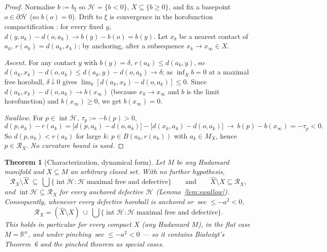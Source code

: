 \documentclass[11pt]{article}
\newtheorem{theorem}{Theorem}[section]
\theoremstyle{remark}
\newcommand{\R}{\mathbb{R}}
\newcommand{\X}{X}
\newcommand{\Xhat}{\widehat{\X}}
\newcommand{\Mx}{M_{\X}}
\newcommand{\Rx}{\mathcal{R}_{\X}}
\newcommand{\Hb}[1]{\mathcal{H}_{#1}}
\begin{document}
\begin{proof}
Normalise $b:=b_{\xi}$ so $\Hb{}=\{b<0\}$, $X\subseteq\{b\ge0\}$, and
fix a basepoint $o\in\partial\Hb{}$ (so $b(o)=0$). Drift to $\xi$ is
convergence in the horofunction compactification \cite[II.8.13]{BH}:
for every fixed $y$, $d(y,a_{k})-d(o,a_{k})\to b(y)-b(o)=b(y)$. Let
$x_{k}$ be a nearest contact of $a_{k}$, $r(a_{k})=d(a_{k},x_{k})$; by
anchoring, after a subsequence $x_{k}\to x_{\infty}\in X$.

\emph{Ascent.} For any contact $y$ with $b(y)=\delta$,
$r(a_{k})\le d(a_{k},y)$, so $d(a_{k},x_{k})-d(o,a_{k})\le
d(a_{k},y)-d(o,a_{k})\to\delta$; as $\inf_{X}b=0$ at a maximal free
horoball, $\delta\downarrow0$ gives
$\lim_k[d(a_{k},x_{k})-d(o,a_{k})]\le 0$. Since
$d(a_{k},x_{k})-d(o,a_{k})\to b(x_{\infty})$ (because $x_{k}\to
x_{\infty}$ and $b$ is the limit horofunction) and $b(x_{\infty})\ge0$,
we get $b(x_{\infty})=0$.

\emph{Swallow.} For $p\in\operatorname{int}\Hb{}$, $\tau_{p}:=-b(p)>0$,
\[
  d(p,a_{k})-r(a_{k})=\bigl[d(p,a_{k})-d(o,a_{k})\bigr]
  -\bigl[d(x_{k},a_{k})-d(o,a_{k})\bigr]
  \ \longrightarrow\ b(p)-b(x_{\infty})=-\tau_{p}<0 .
\]
So $d(p,a_{k})<r(a_{k})$ for large $k$: $p\in B(a_{k},r(a_{k}))$ with
$a_{k}\in\Mx$, hence $p\in\Rx$. \emph{No curvature bound is used.}
\end{proof}

\begin{theorem}[Characterization, dynamical form]\label{thm:fullgen}
Let $M$ be \emph{any} Hadamard manifold and $X\subseteq M$ an arbitrary
closed set. With no further hypothesis,
\[
  \Rx\setminus\Xhat\ \subseteq\
  \bigcup\{\operatorname{int}\Hb{}:\Hb{}\ \text{maximal free and
  defective}\}\qquad\text{and}\qquad \Xhat\setminus X\subseteq\Rx ,
\]
and $\operatorname{int}\Hb{}\subseteq\Rx$ for every anchored defective
$\Hb{}$ (Lemma~\ref{lem:swallow}). Consequently, whenever every
defective horoball is anchored or $\sec\le-a^{2}<0$,
\[
  \Rx=(\Xhat\setminus X)\ \cup\
  \bigcup\bigl\{\operatorname{int}\Hb{}:\Hb{}\ \text{maximal free and
  defective}\bigr\} .
\]
This holds in particular for every compact $X$ (any Hadamard $M$), in
the flat case $M=\R^{n}$, and under pinching $\sec\le-a^{2}<0$ --- so
it contains Bia\l{}o\.zyt's Theorem~6 and the pinched theorem as
special cases.
\end{theorem}
\end{document}
